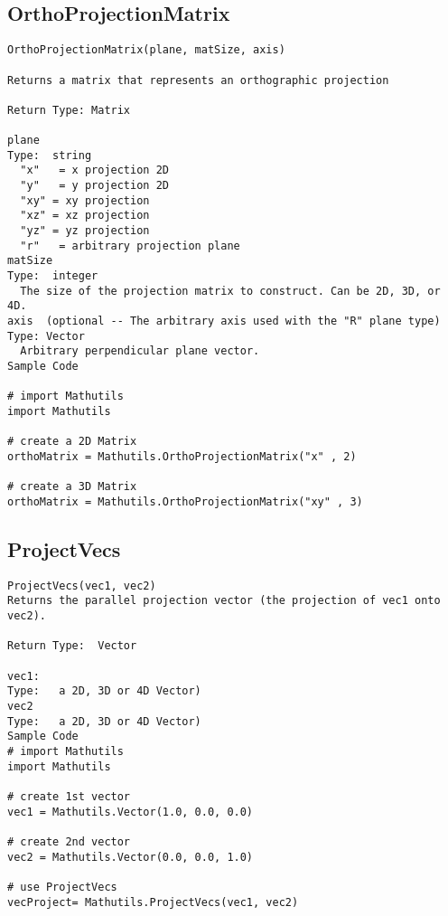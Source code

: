 \subsection{OrthoProjectionMatrix}
\begin{verbatim}
OrthoProjectionMatrix(plane, matSize, axis)

Returns a matrix that represents an orthographic projection

Return Type: Matrix

plane
Type:  string
  "x"   = x projection 2D
  "y"   = y projection 2D
  "xy" = xy projection
  "xz" = xz projection
  "yz" = yz projection
  "r"   = arbitrary projection plane
matSize
Type:  integer
  The size of the projection matrix to construct. Can be 2D, 3D, or 4D.
axis  (optional -- The arbitrary axis used with the "R" plane type)
Type: Vector
  Arbitrary perpendicular plane vector.
Sample Code

# import Mathutils
import Mathutils

# create a 2D Matrix
orthoMatrix = Mathutils.OrthoProjectionMatrix("x" , 2)

# create a 3D Matrix
orthoMatrix = Mathutils.OrthoProjectionMatrix("xy" , 3)
\end{verbatim}

\subsection{ProjectVecs}
\begin{verbatim}
ProjectVecs(vec1, vec2)
Returns the parallel projection vector (the projection of vec1 onto vec2).

Return Type:  Vector

vec1:
Type:   a 2D, 3D or 4D Vector)
vec2
Type:   a 2D, 3D or 4D Vector)
Sample Code
# import Mathutils
import Mathutils

# create 1st vector 
vec1 = Mathutils.Vector(1.0, 0.0, 0.0)

# create 2nd vector 
vec2 = Mathutils.Vector(0.0, 0.0, 1.0)

# use ProjectVecs
vecProject= Mathutils.ProjectVecs(vec1, vec2)
\end{verbatim}


